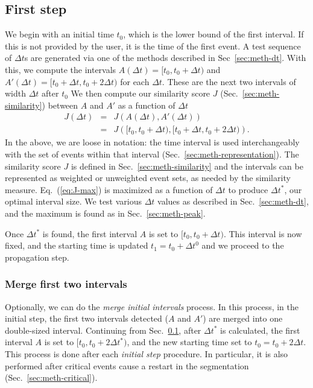 \documentclass[draft]{article}
\begin{document}
\subsection{First step}
\label{sec:meth-firststep}
We begin with an initial time $t_0$, which is the lower bound of the
first interval.  If this is not provided by the user, it is the
time of the first event.  A test sequence of $\Delta t$s are generated
via one of the methods described in Sec~\ref{sec:meth-dt}.  With this, we compute
the intervals $ A(\Delta t) = [t_0, t_0+\Delta t)$ and $A'(\Delta t) =
[t_0+\Delta t, t_0+2\Delta t)$ for each $\Delta t$.  These are the
next two intervals of width $\Delta t$ after $t_0$  We then compute
our similarity score $J$ (Sec.~\ref{sec:meth-similarity}) between $A$ and
$A'$ as a function of $\Delta t$
\begin{eqnarray}
  J(\Delta t) &=& J\left(A(\Delta t), A'(\Delta t)\right) \nonumber \\
              &=& J\left([t_0, t_0+\Delta t),  [t_0+\Delta t, t_0+2\Delta t)\right).
              \label{eq:J-max}
\end{eqnarray}
In the above, we are loose in notation: the time interval is used
interchangeably with the set of events within that interval
(Sec.~\ref{sec:meth-representation}).  The
similarity score $J$ is defined in Sec.~\ref{sec:meth-similarity}
and the intervals can be represented as weighted or unweighted event
sets, as needed by the similarity measure.  Eq.~(\ref{eq:J-max}) is
maximized as a function of $\Delta t$ to produce
$\Delta t^*$, our optimal interval size.  We test various $\Delta t$
values as described in Sec.~\ref{sec:meth-dt}, and the maximum is
found as in Sec.~\ref{sec:meth-peak}.

Once $\Delta t^*$ is found, the first interval $A$ is set to $[t_0,
t_0+\Delta t)$.  This interval is now fixed, and the
starting time is updated $t_1 = t_0+\Delta t^0$ and we proceed to the
propagation step.

\subsubsection{Merge first two intervals}
\label{sec:meth-mergefirst}
Optionally, we can do the \textit{merge initial intervals} process.
In this process, in the initial step, the first two intervals detected
($A$ and $A'$) are merged into one double-sized interval.  Continuing
from Sec.~\ref{sec:meth-firststep}, after $\Delta t^*$ is calculated,
the first interval $A$ is set to $[t_0, t_0+2\Delta t^*)$, and the new
starting time set to $t_0 = t_0 + 2\Delta t$.  This process is done
after each \textit{initial step} procedure.  In particular, it is also
performed after critical events cause a restart in the segmentation
(Sec.~\ref{sec:meth-critical}).
\end{document}
